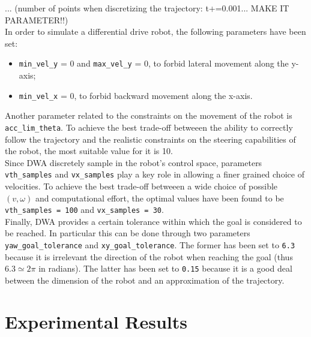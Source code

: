 \documentclass[11pt,a4paper]{article}
\begin{document}
... (number of points when discretizing the trajectory: t+=0.001... MAKE IT PARAMETER!!)\\

In order to simulate a differential drive robot, the following parameters have been set:

\begin{itemize}
    \item \texttt{min\_vel\_y} = 0 and \texttt{max\_vel\_y} = 0, to forbid lateral movement along the y-axis;
    \item \texttt{min\_vel\_x} = 0, to forbid backward movement along the x-axis.\\
\end{itemize}

Another parameter related to the constraints on the movement of the robot is \texttt{acc\_lim\_theta}.
To achieve the best trade-off betweeen the ability to correctly follow the trajectory and the realistic
constraints on the steering capabilities of the robot, the most suitable value for it is 10.\\

Since DWA discretely sample in the robot's control space, parameters \texttt{vth\_samples} and \texttt{vx\_samples}
play a key role in allowing a finer grained choice of velocities.
To achieve the best trade-off betweeen a wide choice of possible $(v,\omega)$ and computational effort,
the optimal values have been found to be \texttt{vth\_samples = 100} and \texttt{vx\_samples = 30}.\\

Finally, DWA provides a certain tolerance within which the goal is considered to be reached.
In particular this can be done through two parameters \texttt{yaw\_goal\_tolerance} and \texttt{xy\_goal\_tolerance}.
The former has been set to \texttt{6.3} because it is irrelevant the direction of the robot when reaching the goal
(thus $6.3 \simeq 2\pi$ in radians).
The latter has been set to \texttt{0.15} because it is a good deal between the dimension of the robot and
an approximation of the trajectory.



\section{Experimental Results}
\end{document}
